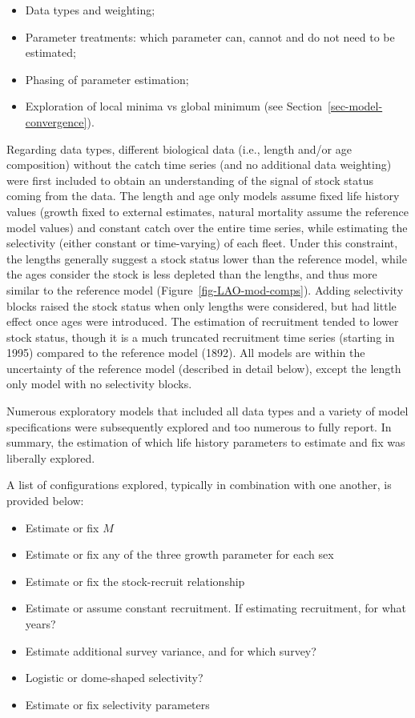 \documentclass[
]{scrartcl}
\providecommand{\tightlist}{%
  \setlength{\itemsep}{0pt}\setlength{\parskip}{0pt}}\usepackage{longtable,booktabs,array}
\begin{document}
\begin{itemize}
\tightlist
\item
  Data types and weighting;
\item
  Parameter treatments: which parameter can, cannot and do not need to
  be estimated;
\item
  Phasing of parameter estimation;
\item
  Exploration of local minima vs global minimum (see
  Section~\ref{sec-model-convergence}).
\end{itemize}

Regarding data types, different biological data (i.e., length and/or age
composition) without the catch time series (and no additional data
weighting) were first included to obtain an understanding of the signal
of stock status coming from the data. The length and age only models
assume fixed life history values (growth fixed to external estimates,
natural mortality assume the reference model values) and constant catch
over the entire time series, while estimating the selectivity (either
constant or time-varying) of each fleet. Under this constraint, the
lengths generally suggest a stock status lower than the reference model,
while the ages consider the stock is less depleted than the lengths, and
thus more similar to the reference model
(Figure~\ref{fig-LAO-mod-comps}). Adding selectivity blocks raised the
stock status when only lengths were considered, but had little effect
once ages were introduced. The estimation of recruitment tended to lower
stock status, though it is a much truncated recruitment time series
(starting in 1995) compared to the reference model (1892). All models
are within the uncertainty of the reference model (described in detail
below), except the length only model with no selectivity blocks.

Numerous exploratory models that included all data types and a variety
of model specifications were subsequently explored and too numerous to
fully report. In summary, the estimation of which life history
parameters to estimate and fix was liberally explored.

A list of configurations explored, typically in combination with one
another, is provided below:

\begin{itemize}
\tightlist
\item
  Estimate or fix \(M\)
\item
  Estimate or fix any of the three growth parameter for each sex
\item
  Estimate or fix the stock-recruit relationship
\item
  Estimate or assume constant recruitment. If estimating recruitment,
  for what years?
\item
  Estimate additional survey variance, and for which survey?
\item
  Logistic or dome-shaped selectivity?
\item
  Estimate or fix selectivity parameters
\end{itemize}
\end{document}
